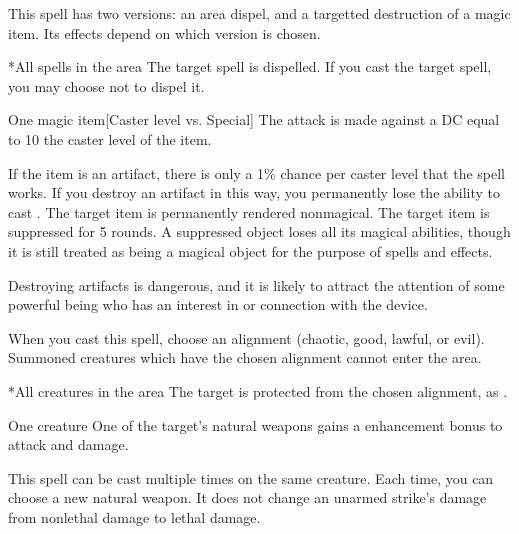 \spellspecial This spell has two versions: an area dispel, and a targetted destruction of a magic item. Its effects depend on which version is chosen.
\spellline
{}
\begin{spelltargets}*{All spells in the area}
    \spelleffect The target spell is dispelled. If you cast the target spell, you may choose not to dispel it.
\end{spelltargets}
\begin{spelltarget}{One magic item}[Caster level vs. Special]
    \spellspecial The attack is made against a DC equal to 10 \add the caster level of the item.

    If the item is an artifact, there is only a 1\% chance per caster level that the spell works. If you destroy an artifact in this way, you permanently lose the ability to cast .
    \spellsuccess The target item is permanently rendered nonmagical.
    \spellfailure The target item is suppressed for 5 rounds. A suppressed object loses all its magical abilities, though it is still treated as being a magical object for the purpose of spells and effects.
\end{spelltarget}
\spellnotes Destroying artifacts is dangerous, and it is likely to attract the attention of some powerful being who has an interest in or connection with the device.

\spelldur{\durshort \dismissable}
\spellspecial When you cast this spell, choose an alignment (chaotic, good, lawful, or evil).
\spellline
\spelleffect Summoned creatures which have the chosen alignment cannot enter the area.
\begin{spelltargets}*{All creatures in the area}
    \spelleffect The target is protected from the chosen alignment, as .
\end{spelltargets}

\spellrng{\rngclose}
\spelldur{\durshort}
\begin{spelltarget}{One creature}
    \spelleffect One of the target's natural weapons gains a  enhancement bonus to attack and damage. \spellbonusscalingdescription
\end{spelltarget}
\spellnotes This spell can be cast multiple times on the same creature. Each time, you can choose a new natural weapon. It does not change an unarmed strike's damage from nonlethal damage to lethal damage.

